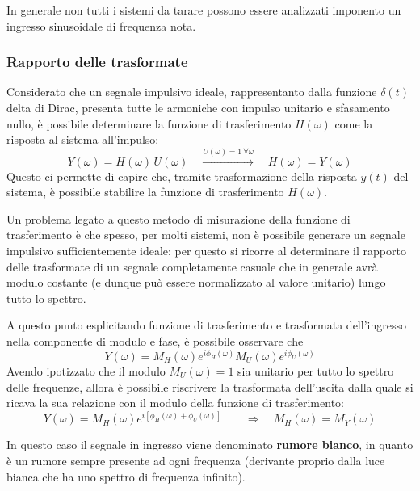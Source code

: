 		\begin{nota}
			In generale non tutti i sistemi da tarare possono essere analizzati imponento un ingresso sinusoidale di frequenza nota.	
		\end{nota}
	
	\subsubsection{Rapporto delle trasformate}
		Considerato che un segnale impulsivo ideale, rappresentanto dalla funzione $\delta(t)$ delta di Dirac, presenta tutte le armoniche con impulso unitario e sfasamento nullo, è possibile determinare la funzione di trasferimento $H(\omega)$ come la risposta al sistema all'impulso:
		\[ Y(\omega) = H(\omega)\, U(\omega) \quad \xrightarrow{U(\omega) = 1 \ \forall \omega} \quad H(\omega ) = Y(\omega) \]
		Questo ci permette di capire che, tramite trasformazione della risposta $y(t)$ del sistema, è possibile stabilire la funzione di trasferimento $H(\omega)$.
		
		\vspace{3mm}
		
		Un problema legato a questo metodo di misurazione della funzione di trasferimento è che spesso, per molti sistemi, non è possibile generare un segnale impulsivo sufficientemente ideale: per questo si ricorre al determinare il rapporto delle trasformate di un segnale completamente casuale che in generale avrà modulo costante (e dunque può essere normalizzato al valore unitario) lungo tutto lo spettro.
		
		A questo punto esplicitando funzione di trasferimento e trasformata dell'ingresso nella componente di modulo e fase, è possibile osservare che
		\[ Y(\omega) = M_H(\omega) e^{i\phi_H(\omega)} M_U(\omega) e^{i\phi_U(\omega)}  \]
		Avendo ipotizzato che il modulo $M_U(\omega) = 1$ sia unitario per tutto lo spettro delle frequenze, allora è possibile riscrivere la trasformata dell'uscita dalla quale si ricava la sua relazione con il modulo della funzione di trasferimento:
		\[ Y(\omega) = M_H(\omega) e^{i\left[\phi_H(\omega) + \phi_U(\omega)\right]}  \qquad \Rightarrow \quad  M_H(\omega) = M_Y(\omega) \]
		
		In questo caso il segnale in ingresso viene denominato \textbf{rumore bianco}, in quanto è un rumore sempre presente ad ogni frequenza (derivante proprio dalla luce bianca che ha uno spettro di frequenza infinito).
		
